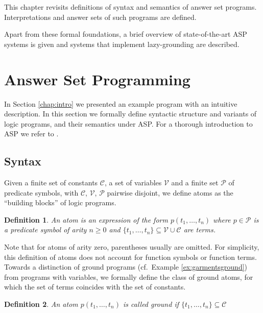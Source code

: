\documentclass[final]{vutinfth} %
\newtheorem{definition}{Definition}[chapter]
\begin{document}
This chapter revisits definitions of syntax and semantics of answer set programs. Interpretations and answer sets of such programs are defined.

Apart from these formal foundations, a brief overview of state-of-the-art ASP systems is given and systems that implement lazy-grounding are described.

\section{Answer Set Programming}

In Section \ref{chap:intro} we presented an example program with an intuitive description. In this section we formally define syntactic structure and variants of logic programs, and their semantics under ASP. For a thorough introduction to ASP we refer to \cite{DBLP:conf/rweb/EiterIK09}.

\subsection{Syntax}


Given a finite set of constants $\mathcal{C}$, a set of variables $\mathcal{V}$ and a finite set $\mathcal{P}$ of predicate symbols, with $\mathcal{C}$, $\mathcal{V}$, $\mathcal{P}$ pairwise disjoint, we define atoms as the \enquote{building blocks} of logic programs.

\begin{definition}
An \emph{atom} is an expression of the form $p(t_1, \ldots , t_n)$ where $p \in \mathcal{P}$ is a predicate symbol of arity $n \geq 0$ and $\{ t_1, \ldots , t_n \} \subseteq \mathcal{V} \cup \mathcal{C}$ are terms.
\end{definition}

Note that for atoms of arity zero, parentheses usually are omitted. For simplicity, this definition of atoms does not account for function symbols or function terms. Towards a distinction of ground programs (cf.~Example \ref{ex:garmentsground}) from programs with variables, we formally define the class of ground atoms, for which the set of terms coincides with the set of constants.

\begin{definition}
An atom $p(t_1, \ldots , t_n)$ is called \emph{ground} if $\{ t_1, \ldots , t_n \} \subseteq \mathcal{C}$
\end{definition}
\end{document}
